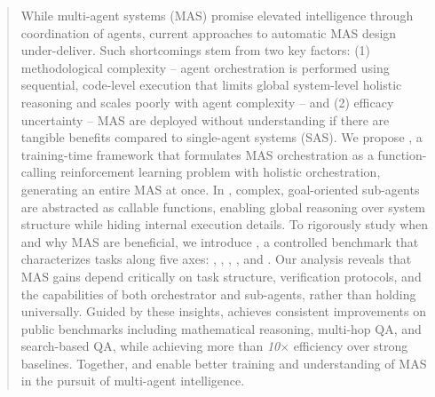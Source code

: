 
\begin{abstract}




While multi-agent systems (MAS) promise elevated intelligence through coordination of agents, current approaches to automatic MAS design under-deliver. Such shortcomings stem from two key factors: (1) methodological complexity -- agent orchestration is performed using sequential, code-level execution that limits global system-level holistic reasoning and scales poorly with agent complexity -- and (2) efficacy uncertainty -- MAS are deployed without understanding if there are tangible benefits compared to single-agent systems (SAS). We propose \ourframework, a training-time framework that formulates MAS orchestration as a function-calling reinforcement learning problem with holistic orchestration, generating an entire MAS at once. In \ourframework, complex, goal-oriented sub-agents are abstracted as callable functions, enabling global reasoning over system structure while hiding internal execution details. To rigorously study when and why MAS are beneficial, we introduce \ourbenchmark, a controlled benchmark that characterizes tasks along five axes: \depth, \horizon, \breadth, \myparallel, and \robustness. Our analysis reveals that MAS gains depend critically on task structure, verification protocols, and the capabilities of both orchestrator and sub-agents, rather than holding universally. Guided by these insights, \ourframework achieves consistent improvements on public benchmarks including mathematical reasoning,  multi-hop QA, and search-based QA, {while achieving more than \textit{10$\times$} efficiency over strong baselines}. Together, \ourframework and \ourbenchmark enable better training and understanding of MAS in the pursuit of multi-agent intelligence.








\end{abstract}
